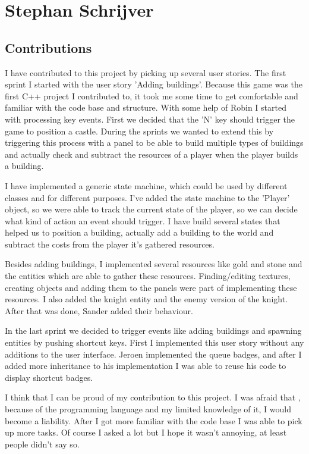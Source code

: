 \section{Stephan Schrijver}
\subsection{Contributions}
I have contributed to this project by picking up several user stories.
The first sprint I started with the user story 'Adding buildings'. Because this game was the first C++ project I contributed to, it took me some time to get comfortable and familiar with the code base and structure. With some help of Robin I started with processing key events. First we decided that the 'N' key should trigger the game to position a castle. During the sprints we wanted to extend this by triggering this process with a panel to be able to build multiple types of buildings and actually check and subtract the resources of a player when the player builds a building.

I have implemented a generic state machine, which could be used by different classes and for different purposes. I've added the state machine to the 'Player' object, so we were able to track the current state of the player, so we can decide what kind of action an event should trigger. I have build several states that helped us to position a building, actually add a building to the world and subtract the costs from the player it's gathered resources.

Besides adding buildings, I implemented several resources like gold and stone and the entities which are able to gather these resources. Finding/editing textures, creating objects and adding them to the panels were part of implementing these resources. I also added the knight entity and the enemy version of the knight. After that was done, Sander added their behaviour.

In the last sprint we decided to trigger events like adding buildings and spawning entities by pushing shortcut keys. First I implemented this user story without any additions to the user interface. Jeroen implemented the queue badges, and after I added more inheritance to his implementation I was able to reuse his code to display shortcut badges.

I think that I can be proud of my contribution to this project. I was afraid that , because of the programming language and my limited knowledge of it, I would become a liability. After I got more familiar with the code base I was able to pick up more tasks. Of course I asked a lot but I hope it wasn't annoying, at least people didn't say so.

